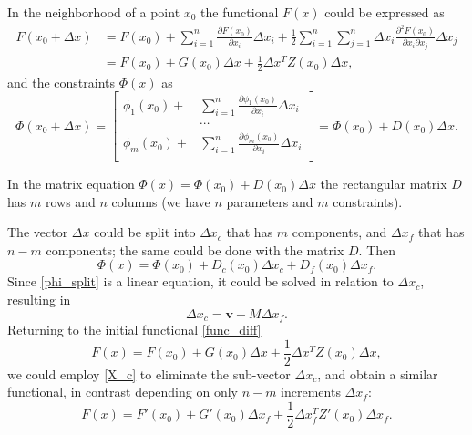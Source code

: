 In the neighborhood of a point $x_0$ the functional $F(x)$ could be expressed as
\begin{equation}\label{func_diff}
\begin{aligned}
F(x_0+\Delta x) &= F(x_0) + \sum_{i=1}^n \frac{\partial F(x_0)}{\partial x_i} \Delta x_i + \frac{1}{2}\sum_{i=1}^n\sum_{j=1}^n \Delta x_i \frac{\partial^2 F(x_0)}{\partial x_i \partial x_j} \Delta x_j\\
&= F(x_0) + G(x_0) \Delta x + \frac{1}{2}\Delta x^T Z(x_0) \Delta x,
\end{aligned}
\end{equation}
and the constraints $\Phi(x)$ as
\begin{equation}\label{constr_diff}
\Phi(x_0+\Delta x) =
\left[
\begin{aligned}
\phi_1(x_0) +& \sum_{i=1}^n \frac{\partial \phi_1(x_0)}{\partial x_i}\Delta x_i\\
&\cdots\\
\phi_m(x_0) +& \sum_{i=1}^n \frac{\partial \phi_m(x_0)}{\partial x_i}\Delta x_i\\
\end{aligned}
\right]
= \Phi(x_0) + D(x_0) \Delta x.
\end{equation}

In the matrix equation $\Phi(x) = \Phi(x_0) + D(x_0) \Delta x$ the rectangular matrix $D$ has $m$ rows and $n$ columns (we have $n$ parameters and $m$ constraints).

The vector $\Delta x$ could be split into $\Delta x_c$ that has $m$ components, and $\Delta x_f$ that has $n-m$ components; the same could be done with the matrix $D$. Then
\begin{equation}\label{phi_split}
\Phi(x) = \Phi(x_0) + D_c(x_0) \Delta x_c + D_f(x_0) \Delta x_f.
\end{equation}
Since \eqref{phi_split} is a linear equation, it could be solved in relation to $\Delta x_c$, resulting in
\begin{equation}\label{X_c}
\Delta x_c = \mathbf{v} + M \Delta x_f.
\end{equation}
Returning to the initial functional \eqref{func_diff}
\[F(x) = F(x_0) + G(x_0) \Delta x + \frac{1}{2}\Delta x^T Z(x_0) \Delta x,\]
we could employ \eqref{X_c} to eliminate the sub-vector $\Delta x_c$, and obtain a similar functional, in contrast depending on only $n-m$ increments $\Delta x_f$:
\begin{equation}\label{func_fin}
F(x) = F'(x_0) + G'(x_0) \Delta x_f + \frac{1}{2}\Delta x_f^T Z'(x_0) \Delta x_f.
\end{equation}
